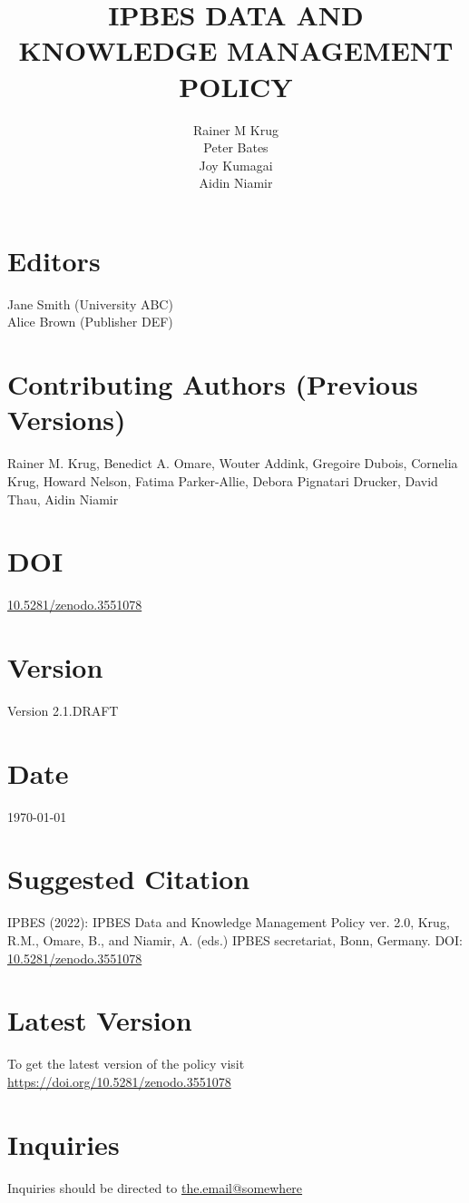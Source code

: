 \documentclass{article}
\title{IPBES DATA AND KNOWLEDGE MANAGEMENT POLICY}
\author{
    Rainer M Krug \\
    Peter Bates \\ 
    Joy Kumagai \\
    Aidin Niamir
}
\date{}
\begin{document}
\maketitle
\section*{Editors}
Jane Smith (University ABC) \\
Alice Brown (Publisher DEF) 

\section*{Contributing Authors (Previous Versions)}
Rainer M. Krug, Benedict A. Omare, Wouter Addink, Gregoire Dubois, Cornelia Krug, Howard Nelson, Fatima Parker-Allie, Debora Pignatari Drucker, David Thau, Aidin Niamir

\section*{DOI}
\href{https://doi.org/10.5281/zenodo.3551078}{10.5281/zenodo.3551078}

\section*{Version}
Version 2.1.DRAFT

\section*{Date}
\today

\section*{Suggested Citation}
IPBES (2022): IPBES Data and Knowledge Management Policy ver. 2.0, Krug, R.M., Omare, B., and Niamir, A. (eds.) IPBES secretariat, Bonn, Germany. DOI: \href{https://doi.org/10.5281/zenodo.3551078}{10.5281/zenodo.3551078}

\section*{Latest Version}
To get the latest version of the policy visit \href{https://doi.org/10.5281/zenodo.3551078}{https://doi.org/10.5281/zenodo.3551078}

\section*{Inquiries}
Inquiries should be directed to \href{mailto:the.email@somewhere}{the.email@somewhere}
\end{document}
